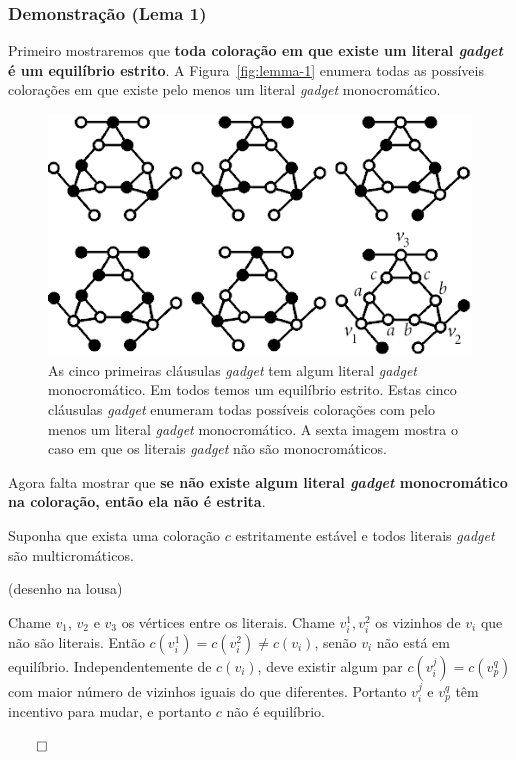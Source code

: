 \documentclass{beamer}
\theoremstyle{plain}
\newcommand{\gadget}{\textit{gadget}}
\begin{document}
\begin{frame}
  \frametitle{Demonstração (Lema 1)}

  Primeiro mostraremos que \textbf{toda coloração em que existe um literal \gadget{} é um
  equilíbrio estrito}. A Figura~\autoref{fig:lemma-1} enumera todas as possíveis colorações em que
  existe pelo menos um literal \gadget{} monocromático.

  \begin{figure}[h]
    \centering\includegraphics[scale=0.35]{imgs/lemma-1.png}
    \captionsetup{justification=raggedright}
    \caption{\label{fig:lemma-1}As cinco primeiras cláusulas \gadget{} tem algum literal \gadget{}
    monocromático. Em todos temos um equilíbrio estrito. Estas cinco cláusulas \gadget{} enumeram
    todas possíveis colorações com pelo menos um literal \gadget{} monocromático. A sexta imagem
    mostra o caso em que os literais \gadget{} não são monocromáticos.}
  \end{figure}
\end{frame}

\begin{frame}
  Agora falta mostrar que \textbf{se não existe algum literal \gadget{} monocromático na coloração,
  então ela não é estrita}.

  Suponha que exista uma coloração $c$ estritamente estável e todos literais \gadget{} são
  multicromáticos.

  {\color{gray} (desenho na lousa)}

  Chame $v_1$, $v_2$ e $v_3$ os vértices entre os literais. Chame $v_i^1,v_i^2$ os vizinhos de
  $v_i$ que não são literais. Então $c(v_i^1)=c(v_i^2)\neq c(v_i)$, senão $v_i$ não está em
  equilíbrio. Independentemente de $c(v_i)$, deve existir algum par $c(v_i^j)=c(v_p^q)$ com
  maior número de vizinhos iguais do que diferentes. Portanto $v_i^j$ e $v_p^q$ têm incentivo para
  mudar, e portanto $c$ não é equilíbrio.

  \hfill{}$\qed$
\end{frame}
\end{document}
